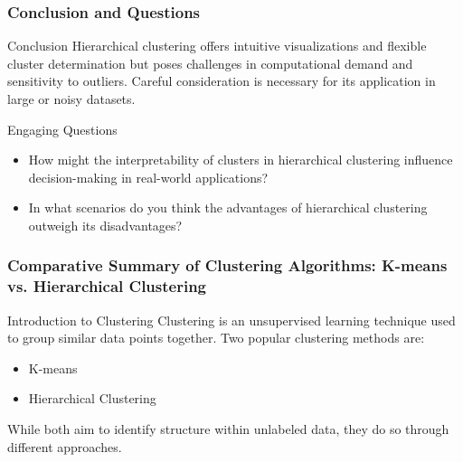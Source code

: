 \documentclass[aspectratio=169]{beamer}
\begin{document}
\begin{frame}[fragile]
    \frametitle{Conclusion and Questions}
    \begin{block}{Conclusion}
        Hierarchical clustering offers intuitive visualizations and flexible cluster determination but poses challenges in computational demand and sensitivity to outliers. Careful consideration is necessary for its application in large or noisy datasets.
    \end{block}

    \begin{block}{Engaging Questions}
        \begin{itemize}
            \item How might the interpretability of clusters in hierarchical clustering influence decision-making in real-world applications?
            \item In what scenarios do you think the advantages of hierarchical clustering outweigh its disadvantages?
        \end{itemize}
    \end{block}
\end{frame}

\begin{frame}[fragile]
    \frametitle{Comparative Summary of Clustering Algorithms: K-means vs. Hierarchical Clustering}
    
    \begin{block}{Introduction to Clustering}
        Clustering is an unsupervised learning technique used to group similar data points together. 
        Two popular clustering methods are:
        \begin{itemize}
            \item K-means
            \item Hierarchical Clustering
        \end{itemize}
        While both aim to identify structure within unlabeled data, they do so through different approaches.
    \end{block}
\end{frame}
\end{document}
